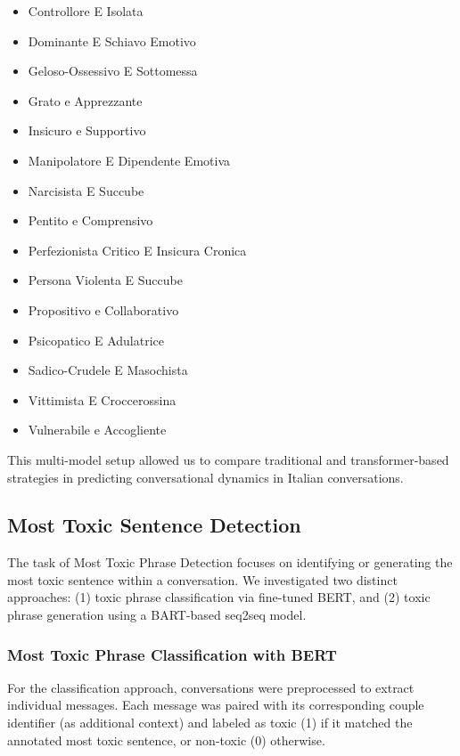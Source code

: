 \documentclass[conference]{IEEEtran}
\begin{document}
\begin{itemize}
    \item Controllore E Isolata
    \item Dominante E Schiavo Emotivo
    \item Geloso-Ossessivo E Sottomessa
    \item Grato e Apprezzante
    \item Insicuro e Supportivo
    \item Manipolatore E Dipendente Emotiva
    \item Narcisista E Succube
    \item Pentito e Comprensivo
    \item Perfezionista Critico E Insicura Cronica
    \item Persona Violenta E Succube
    \item Propositivo e Collaborativo
    \item Psicopatico E Adulatrice
    \item Sadico-Crudele E Masochista
    \item Vittimista E Croccerossina
    \item Vulnerabile e Accogliente
\end{itemize}

This multi-model setup allowed us to compare traditional and transformer-based strategies in predicting conversational dynamics in Italian conversations.

\subsection{Most Toxic Sentence Detection}

The task of Most Toxic Phrase Detection focuses on identifying or generating the most toxic sentence within a conversation. We investigated two distinct approaches: (1) toxic phrase classification via fine-tuned BERT, and (2) toxic phrase generation using a BART-based seq2seq model.

\subsubsection{Most Toxic Phrase Classification with BERT}

For the classification approach, conversations were preprocessed to extract individual messages. Each message was paired with its corresponding couple identifier (as additional context) and labeled as toxic (1) if it matched the annotated most toxic sentence, or non-toxic (0) otherwise.
\end{document}
